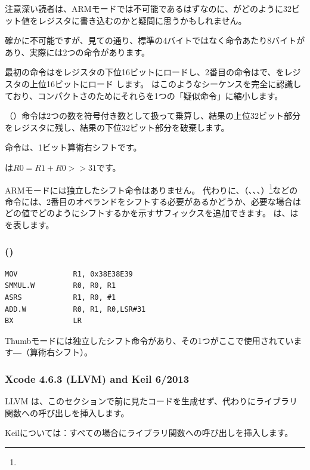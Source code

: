 注意深い読者は、ARMモードでは不可能であるはずなのに、\MOV がどのように32ビット値をレジスタに書き込むのかと疑問に思うかもしれません。

確かに不可能ですが、見ての通り、標準の4バイトではなく命令あたり8バイトがあり、実際には2つの命令があります。

最初の命令はをレジスタの下位16ビットにロードし、2番目の命令はで、をレジスタの上位16ビットにロード します。
\IDA はこのようなシーケンスを完全に認識しており、コンパクトさのためにそれらを1つの「疑似命令」に縮小します。

（）命令は2つの数を符号付き数として扱って乗算し、結果の上位32ビット部分をレジスタに残し、結果の下位32ビット部分を破棄します。

命令は、1ビット算術右シフトです。

は$R0=R1 + R0>>31$です。

\label{shifts_in_ARM_mode}

ARMモードには独立したシフト命令はありません。
代わりに、（\MOV、\ADD、\SUB、）\footnote{\DataProcessingInstructionsFootNote}などの命令には、2番目のオペランドをシフトする必要があるかどうか、必要な場合はどの値でどのようにシフトするかを示すサフィックスを追加できます。
は、はを表します。

\subsubsection{\OptimizingXcodeIV (\ThumbTwoMode)}

\begin{lstlisting}[style=customasmARM]
MOV             R1, 0x38E38E39
SMMUL.W         R0, R0, R1
ASRS            R1, R0, #1
ADD.W           R0, R1, R0,LSR#31
BX              LR
\end{lstlisting}


Thumbモードには独立したシフト命令があり、その1つがここで使用されています―（算術右シフト）。

\subsubsection{\NonOptimizing Xcode 4.6.3 (LLVM) and Keil 6/2013}

\NonOptimizing LLVM
は、このセクションで前に見たコードを生成せず、代わりにライブラリ関数への呼び出しを挿入します。

Keilについては：すべての場合にライブラリ関数への呼び出しを挿入します。